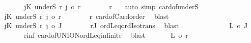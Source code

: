 \begin{isabellebody}
\ \ \ \ \ \isacommand{{\isacharbraceleft}{\kern0pt}}\isamarkupfalse%
\isamarkupfalse%
\ {\isachardoublequoteopen}{\isasymforall}j{\isasymin}K{\isachardot}{\kern0pt}\ {\isacharbar}{\kern0pt}underS\ {\isacharquery}{\kern0pt}r{\isacharprime}{\kern0pt}\ j{\isacharbar}{\kern0pt}\ {\isacharless}{\kern0pt}o\ {\isacharquery}{\kern0pt}r{\isacharprime}{\kern0pt}{\isachardoublequoteclose}\isanewline
\ \ \ \ \ \ \isamarkupfalse%
\ r{\isacharprime}{\kern0pt}\ {}\ \isamarkupfalse%
\ {\isacharparenleft}{\kern0pt}auto\ simp{\isacharcolon}{\kern0pt}\ card{\isacharunderscore}{\kern0pt}of{\isacharunderscore}{\kern0pt}underS{\isacharparenright}{\kern0pt}\isanewline
\ \ \ \ \ \ \isamarkupfalse%
\ {\isachardoublequoteopen}{\isasymforall}j{\isasymin}K{\isachardot}{\kern0pt}\ {\isacharbar}{\kern0pt}underS\ {\isacharquery}{\kern0pt}r{\isacharprime}{\kern0pt}\ j{\isacharbar}{\kern0pt}\ {\isasymle}o\ r{\isachardoublequoteclose}\isanewline
\ \ \ \ \ \ \isamarkupfalse%
\ r{\isacharprime}{\kern0pt}\ card{\isacharunderscore}{\kern0pt}of{\isacharunderscore}{\kern0pt}Card{\isacharunderscore}{\kern0pt}order\ \isamarkupfalse%
\ blast\isanewline
\ \ \ \ \ \ \isamarkupfalse%
\ {\isachardoublequoteopen}{\isasymforall}j{\isasymin}K{\isachardot}{\kern0pt}\ {\isacharbar}{\kern0pt}underS\ {\isacharquery}{\kern0pt}r{\isacharprime}{\kern0pt}\ j{\isacharbar}{\kern0pt}\ {\isasymle}o\ {\isacharbar}{\kern0pt}{\isacharquery}{\kern0pt}J{\isacharbar}{\kern0pt}{\isachardoublequoteclose}\isanewline
\ \ \ \ \ \ \isamarkupfalse%
\ rJ\ ordLeq{\isacharunderscore}{\kern0pt}ordIso{\isacharunderscore}{\kern0pt}trans\ \isamarkupfalse%
\ blast\isanewline
\ \ \ \ \ \isacommand{{\isacharbraceright}{\kern0pt}}\isamarkupfalse%
\isanewline
\ \ \ \ \ \isamarkupfalse%
\ \isamarkupfalse%
\ {\isachardoublequoteopen}{\isacharbar}{\kern0pt}{\isacharquery}{\kern0pt}L{\isacharbar}{\kern0pt}\ {\isasymle}o\ {\isacharbar}{\kern0pt}{\isacharquery}{\kern0pt}J{\isacharbar}{\kern0pt}{\isachardoublequoteclose}\isanewline
\ \ \ \ \ \isamarkupfalse%
\ r{\isacharunderscore}{\kern0pt}inf\ card{\isacharunderscore}{\kern0pt}of{\isacharunderscore}{\kern0pt}UNION{\isacharunderscore}{\kern0pt}ordLeq{\isacharunderscore}{\kern0pt}infinite\ \isamarkupfalse%
\ blast\isanewline
\ \ \ \ \ \isamarkupfalse%
\ {\isachardoublequoteopen}{\isacharbar}{\kern0pt}{\isacharquery}{\kern0pt}L{\isacharbar}{\kern0pt}\ {\isasymle}o\ r{\isachardoublequoteclose}\ \isamarkupfalse%

\end{isabellebody}
